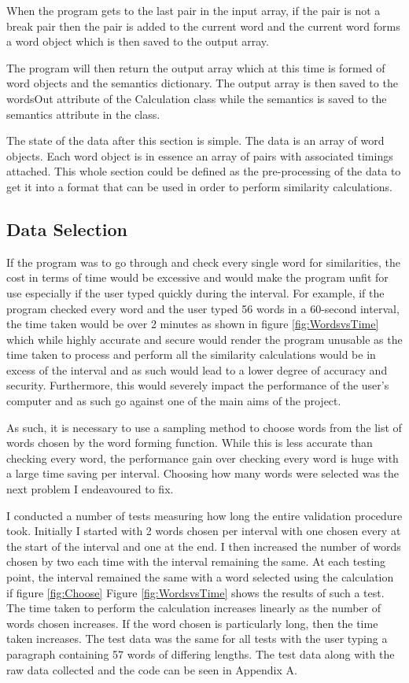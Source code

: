 \documentclass[10pt,a4paper]{report}
\begin{document}
When the program gets to the last pair in the input array, if the pair is not a break pair then the pair is added to the current word and the current word forms a word object which is then saved to the output array.

The program will then return the output array which at this time is formed of word objects and the semantics dictionary. The output array is then saved to the wordsOut attribute of the Calculation class while the semantics is saved to the semantics attribute in the class.

The state of the data after this section is simple. The data is an array of word objects. Each word object is in essence an array of pairs with associated timings attached. This whole section could be defined as the pre-processing of the data to get it into a format that can be used in order to perform similarity calculations.

\subsection{Data Selection}

If the program was to go through and check every single word for similarities, the cost in terms of time would be excessive and would make the program unfit for use especially if the user typed quickly during the interval. For example, if the program checked every word and the user typed 56 words in a 60-second interval, the time taken would be over 2 minutes as shown in figure \ref{fig:WordsvsTime} which while highly accurate and secure would render the program unusable as the time taken to process and perform all the similarity calculations would be in excess of the interval and as such would lead to a lower degree of accuracy and security. Furthermore, this would severely impact the performance of the user's computer and as such go against one of the main aims of the project.

As such, it is necessary to use a sampling method to choose words from the list of words chosen by the word forming function. While this is less accurate than checking every word, the performance gain over checking every word is huge with a large time saving per interval. Choosing how many words were selected was the next problem I endeavoured to fix.

I conducted a number of tests measuring how long the entire validation procedure took. Initially I started with 2 words chosen per interval with one chosen every at the start of the interval and one at the end. I then increased the number of words chosen by two each time with the interval remaining the same. At each testing point, the interval remained the same with a word selected using the calculation if figure \ref{fig:Choose} Figure \ref{fig:WordsvsTime} shows the results of such a test. The time taken to perform the calculation increases linearly as the number of words chosen increases. If the word chosen is particularly long, then the time taken increases. The test data was the same for all tests with the user typing a paragraph containing 57 words of differing lengths. The test data along with the raw data collected and the code can be seen in Appendix A. 
\end{document}

